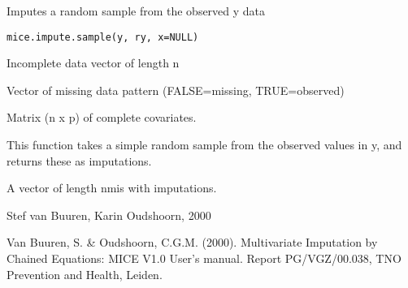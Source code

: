 \begin{Description}\relax
Imputes a random sample from the observed y data
\end{Description}
\begin{Usage}
\begin{verbatim}
mice.impute.sample(y, ry, x=NULL)
\end{verbatim}
\end{Usage}
\begin{Arguments}
\begin{ldescription}
\item[\code{y}] Incomplete data vector of length n
\item[\code{ry}] Vector of missing data pattern (FALSE=missing, TRUE=observed)
\item[\code{x}] Matrix (n x p) of complete covariates.
\end{ldescription}
\end{Arguments}
\begin{Details}\relax
This function takes a simple random sample from the observed values in
y, and returns these as imputations.
\end{Details}
\begin{Value}
A vector of length nmis with imputations.
\end{Value}
\begin{Author}\relax
Stef van Buuren, Karin Oudshoorn, 2000
\end{Author}
\begin{References}\relax
Van Buuren, S. \& Oudshoorn, C.G.M. (2000). Multivariate Imputation by Chained Equations: 
MICE V1.0 User's manual. Report PG/VGZ/00.038, TNO Prevention and Health, Leiden.
\end{References}

